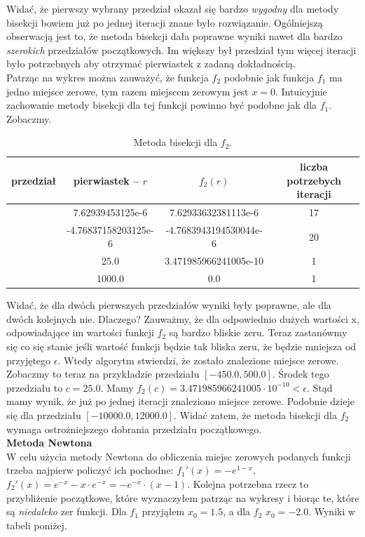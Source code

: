 \documentclass[]{article}
\begin{document}
	Widać, że pierwszy wybrany przedział okazał się bardzo \textit{wygodny} dla metody bisekcji bowiem już po jednej iteracji znane było rozwiązanie. Ogólniejszą obserwacją jest to, że metoda bisekcji dała poprawne wyniki nawet dla bardzo \textit{szerokich} przedziałów początkowych. Im większy był przedział tym więcej iteracji było potrzebnych aby otrzymać pierwiastek z zadaną dokładnością.\\
	Patrząc na wykres można zauważyć, że funkcja $f_2$ podobnie jak funkcja $f_1$ ma jedno miejsce zerowe, tym razem miejscem zerowym jest $x=0$. Intuicyjnie zachowanie metody bisekcji dla tej funkcji powinno być podobne jak dla $f_1$. Zobaczmy.
	\clearpage
		\begin{table}[!h]
		\centering
		\label{tab:table1}
		\begin{tabular}{|c|c|c|c|}
			\hline
			przedział & pierwiastek -- $r$ & $f_2(r)$ & liczba potrzebych iteracji\\
			\hline
			[-1.0, 2.0] & 7.62939453125e-6 & 7.62933632381113e-6 & 17 \\ \hline
			[-10.0, 25.0] & -4.76837158203125e-6 & -4.7683943194530044e-6 & 20 \\ \hline
			[-450.0, 500.0] & 25.0 & 3.471985966241005e-10 & 1 \\ \hline
			[-10000.0, 12000.0] & 1000.0 & 0.0 & 1 \\ \hline
		\end{tabular}
	\caption*{Metoda bisekcji dla $f_2$.}
	\end{table}

	Widać, że dla dwóch pierwszych przedziałów wyniki były poprawne, ale dla dwóch kolejnych nie. Dlaczego? Zauważmy, że dla odpowiednio dużych wartości x, odpowiadające im wartości funkcji $f_2$ są bardzo bliskie zeru. Teraz zastanówmy się co się stanie jeśli wartość funkcji będzie tak bliska zeru, że będzie mniejsza od przyjętego $\epsilon$. Wtedy algorytm stwierdzi, że zostało znalezione miejsce zerowe. Zobaczmy to teraz na przykładzie przedziału $[-450.0, 500.0]$. Środek tego przedziału to $c=25.0$. Mamy $f_2(c)=3.471985966241005\cdot10^{-10}<\epsilon$. Stąd mamy wynik, że już po jednej iteracji znaleziono miejsce zerowe. Podobnie dzieje się dla przedziału $[-10000.0, 12000.0]$. Widać zatem, że metoda bisekcji dla $f_2$ wymaga ostrożniejszego dobrania przedziału początkowego.\\
	\textbf{Metoda Newtona}\\
	W celu użycia metody Newtona do obliczenia miejsc zerowych podanych funkcji trzeba najpierw policzyć ich pochodne: $f_1'(x) = -e^{1-x}$, 
	$f_2'(x) = e^{-x} - x\cdot e^{-x} =-e^{-x}\cdot\left(x-1\right)$. Kolejna potrzebna rzecz to przybliżenie początkowe, które wyznaczyłem patrząc na wykresy i biorąc te, które są \textit{niedaleko} zer funkcji. Dla $f_1$ przyjąłem $x_0=1.5$, a dla $f_2$ $x_0=-2.0$. Wyniki w tabeli poniżej.
\end{document}
